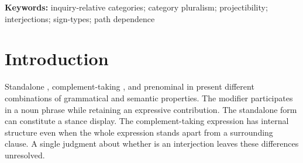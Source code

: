 \begin{abstract}
Disputes about linguistic categories often combine different questions about
the same expressions. English interjections provide a worked case.
Grammatical interjections, expressive signs, depictive signs, and particular
interactional resources preserve different relations, including differences
within a single semantic inquiry. I distinguish constructed classes, useful
for measurement and description, from empirical categories whose co-occurring
properties support induction for particular purposes. Each proposal specifies
its bearer, grouping basis, intended contribution, scope, and alternatives.
A comparison of expressive and depictive uses shows what an undifferentiated
interjection judgment obscures; a phonological case shows why evidence for
one grouping cannot settle a grammatical assignment. Historical explanations
and causal assessments require further evidence, with Hill's considerations
applying to specified causal claims. The relation among fields, inquiries,
and categories is many-to-many: neither a discipline nor a question determines
one privileged grouping. This account locates disagreement more precisely
and makes its evidential consequences explicit, without treating descriptive
usefulness as proof of categoryhood or every failed projection as grounds
for abandoning all related distinctions.
\end{abstract}

\noindent\textbf{Keywords:} inquiry-relative categories; category pluralism;
projectibility; interjections; sign-types; path dependence


\section{Introduction}\label{sec:intro}

Standalone , complement-taking ,
and prenominal  in  present different
combinations of grammatical and semantic properties. The modifier participates
in a noun phrase while retaining an expressive contribution. The standalone
form can constitute a stance display. The complement-taking expression has
internal structure even when the whole expression stands apart from a
surrounding clause. A single judgment about whether  is an
interjection leaves these differences unresolved.

